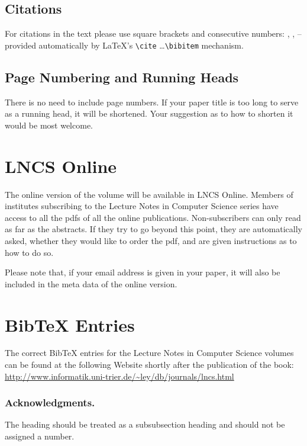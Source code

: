 \documentclass[runningheads,a4paper]{llncs}
\begin{document}
\subsection{Citations}

For citations in the text please use
square brackets and consecutive numbers: \cite{jour}, \cite{lncschap},
\cite{proceeding1} -- provided automatically
by \LaTeX 's \verb|\cite| \dots\verb|\bibitem| mechanism.

\subsection{Page Numbering and Running Heads}

There is no need to include page numbers. If your paper title is too
long to serve as a running head, it will be shortened. Your suggestion
as to how to shorten it would be most welcome.

\section{LNCS Online}

The online version of the volume will be available in LNCS Online.
Members of institutes subscribing to the Lecture Notes in Computer
Science series have access to all the pdfs of all the online
publications. Non-subscribers can only read as far as the abstracts. If
they try to go beyond this point, they are automatically asked, whether
they would like to order the pdf, and are given instructions as to how
to do so.

Please note that, if your email address is given in your paper,
it will also be included in the meta data of the online version.

\section{BibTeX Entries}

The correct BibTeX entries for the Lecture Notes in Computer Science
volumes can be found at the following Website shortly after the
publication of the book:
\url{http://www.informatik.uni-trier.de/~ley/db/journals/lncs.html}

\subsubsection*{Acknowledgments.} The heading should be treated as a
subsubsection heading and should not be assigned a number.
\end{document}
